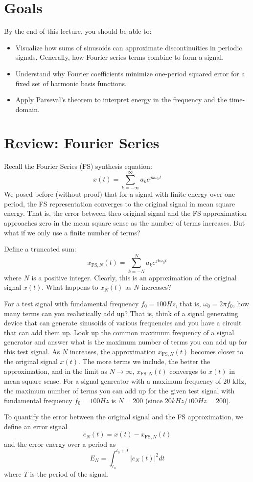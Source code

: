 \section{Goals}
By the end of this lecture, you should be able to:
\begin{itemize}
    \item Visualize how sums of sinusoids can approximate discontinuities in periodic signals. Generally, how Fourier series terms combine to form a signal.
\item Understand why Fourier coefficients minimize one-period squared error for a fixed set of harmonic basis functions.
\item Apply Parseval's theorem to interpret energy in the frequency and the time-domain. 
\end{itemize}

\section{Review: Fourier Series}
Recall the Fourier Series (FS) synthesis equation:
\[
x(t) = \sum_{k=-\infty}^{\infty} a_k e^{j k \omega_0 t}
\]
We posed before (without proof) that for a signal with finite energy over one period, the FS representation converges to the original signal in mean square energy. That is, the error between theo original signal and the FS approximation approaches zero in the mean square sense as the number of terms increases. But what if we only use a finite number of terms? 
\begin{popquiz}
Define a truncated sum:
\[
x_{\text{FS},N}(t) = \sum_{k=-N}^{N} a_k e^{j k \omega_0 t}
\]
where \(N\) is a positive integer. Clearly, this is an approximation of the original signal \(x(t)\). What happens to $x_N(t)$ as $N$ increases? 

For a test signal with fundamental frequency \(f_0 = 100 Hz\), that is, $\omega_0 = 2 \pi f_0$, how many terms can you realistically add up? That is, think of a signal generating device that can generate sinusoids of various frequencies and you have a circuit that can add them up. Look up the common maximum frequency of a signal generator and answer what is the maximum number of terms you can add up for this test signal.
\popqsplit
As $N$ increases, the approximation \(x_{\text{FS},N}(t)\) becomes closer to the original signal \(x(t)\). The more terms we include, the better the approximation, and in the limit as \(N \to \infty\), \(x_{\text{FS},N}(t)\) converges to \(x(t)\) in mean square sense. For a signal genreator with a maximum frequency of 20 kHz, the maximum number of terms you can add up for the given test signal with fundamental frequency \(f_0 = 100 Hz\) is \(N = 200\) (since \(20 kHz / 100 Hz = 200\)).
\end{popquiz}
To quantify the error between the original signal and the FS approximation, we define an error signal
\[
e_N(t) = x(t) - x_{\text{FS},N}(t)
\]
and the error energy over a period as
\[
E_N = \int_{t_0}^{t_0+T} |e_N(t)|^2 dt
\]
where \(T\) is the period of the signal.

